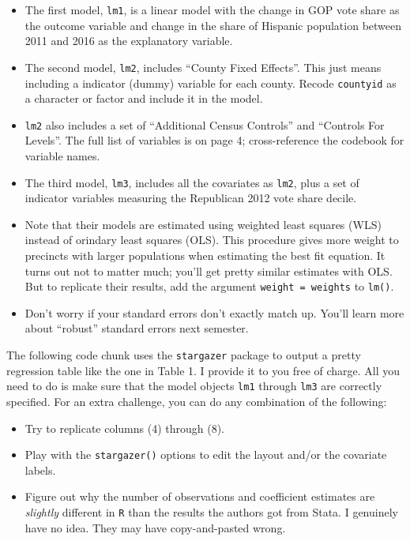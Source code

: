 \documentclass[12pt,halfline,a4paper,]{ouparticle}
\providecommand{\tightlist}{%
  \setlength{\itemsep}{0pt}\setlength{\parskip}{0pt}}
\begin{document}
\begin{itemize}
\tightlist
\item
  The first model, \texttt{lm1}, is a linear model with the change in
  GOP vote share as the outcome variable and change in the share of
  Hispanic population between 2011 and 2016 as the explanatory variable.
\item
  The second model, \texttt{lm2}, includes ``County Fixed Effects''.
  This just means including a indicator (dummy) variable for each
  county. Recode \texttt{countyid} as a character or factor and include
  it in the model.
\item
  \texttt{lm2} also includes a set of ``Additional Census Controls'' and
  ``Controls For Levels''. The full list of variables is on page 4;
  cross-reference the codebook for variable names.
\item
  The third model, \texttt{lm3}, includes all the covariates as
  \texttt{lm2}, plus a set of indicator variables measuring the
  Republican 2012 vote share decile.
\item
  Note that their models are estimated using weighted least squares
  (WLS) instead of orindary least squares (OLS). This procedure gives
  more weight to precincts with larger populations when estimating the
  best fit equation. It turns out not to matter much; you'll get pretty
  similar estimates with OLS. But to replicate their results, add the
  argument \texttt{weight\ =\ weights} to \texttt{lm()}.
\item
  Don't worry if your standard errors don't exactly match up. You'll
  learn more about ``robust'' standard errors next semester.
\end{itemize}

The following code chunk uses the \texttt{stargazer} package to output a
pretty regression table like the one in Table 1. I provide it to you
free of charge. All you need to do is make sure that the model objects
\texttt{lm1} through \texttt{lm3} are correctly specified. For an extra
challenge, you can do any combination of the following:

\begin{itemize}
\tightlist
\item
  Try to replicate columns (4) through (8).
\item
  Play with the \texttt{stargazer()} options to edit the layout and/or
  the covariate labels.
\item
  Figure out why the number of observations and coefficient estimates
  are \emph{slightly} different in \texttt{R} than the results the
  authors got from Stata. I genuinely have no idea. They may have
  copy-and-pasted wrong.
\end{itemize}
\end{document}
